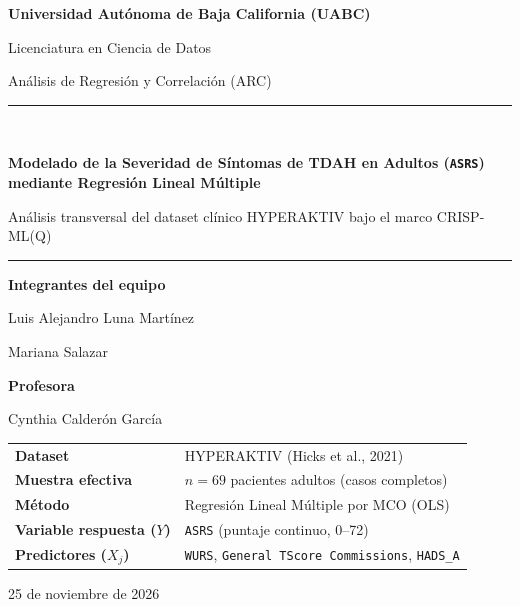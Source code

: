 \documentclass[11pt,letterpaper]{article}
\begin{document}
\begin{titlepage}
  \centering
  \vspace*{1.2cm}
  {\Large\bfseries\color{PrimaryBlue} Universidad Autónoma de Baja California (UABC)\par}
  \vspace{0.3cm}
  {\large Licenciatura en Ciencia de Datos\par}
  {\large Análisis de Regresión y Correlación (ARC)\par}
  \vspace{1.8cm}
  \rule{\textwidth}{1.2pt}\\[0.5cm]
  {\LARGE\bfseries\color{PrimaryBlue} Modelado de la Severidad de Síntomas de TDAH en Adultos (\texttt{ASRS}) mediante Regresión Lineal Múltiple\par}
  \vspace{0.35cm}
  {\large\color{AccentGray} Análisis transversal del dataset clínico HYPERAKTIV bajo el marco CRISP-ML(Q)\par}
  \vspace{0.35cm}
  \rule{\textwidth}{1.2pt}
  \vspace{1.6cm}

  {\large\bfseries Integrantes del equipo\par}
  \vspace{0.35cm}
  {\large Luis Alejandro Luna Martínez\par}
  {\large Mariana Salazar\par}

  \vspace{1.0cm}
  {\large\bfseries Profesora\par}
  \vspace{0.3cm}
  {\large Cynthia Calderón García\par}

  \vspace{1.5cm}
  \begin{tabular}{ll}
    \toprule
    \textbf{Dataset} & HYPERAKTIV (Hicks et al., 2021) \\
    \textbf{Muestra efectiva} & $n = 69$ pacientes adultos (casos completos) \\
    \textbf{Método} & Regresión Lineal Múltiple por MCO (OLS) \\
    \textbf{Variable respuesta ($Y$)} & \texttt{ASRS} (puntaje continuo, 0--72) \\
    \textbf{Predictores ($X_j$)} & \texttt{WURS}, \texttt{General TScore Commissions}, \texttt{HADS\_A} \\
    \bottomrule
  \end{tabular}

  \vfill
  {\large 25 de noviembre de 2026\par}
\end{titlepage}
\end{document}
